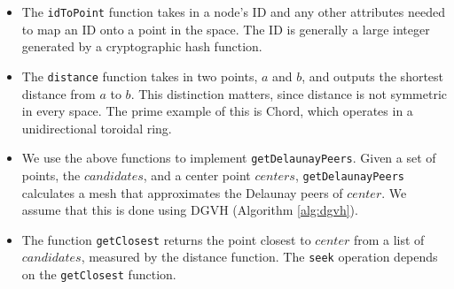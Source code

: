 \documentclass[11pt,conference]{IEEEtran}
\begin{document}
\begin{itemize}

\item The \texttt{idToPoint} function takes in a node's ID and any other attributes needed to map an ID onto a point in the space.
The ID is generally a large integer generated by a cryptographic hash function.


\item The \texttt{distance} function takes in two points, $a$ and $b$, and outputs the shortest distance from $a$ to $b$.
This distinction matters, since distance is not symmetric in every space.
The prime example of this is Chord, which operates in a unidirectional toroidal ring.




\item We use the above functions to implement \texttt{getDelaunayPeers}.
Given a set of points, the $ candidates$, and a center point $ centers$, \texttt{getDelaunayPeers} calculates a mesh that approximates the Delaunay peers of $ center$.
We assume that this is done using DGVH (Algorithm \ref{alg:dgvh}).



\item The function \texttt{getClosest} returns the point closest to $ center$ from a list of $ candidates$, measured by the distance function.
The \texttt{seek} operation depends on the \texttt{getClosest} function.



\end{itemize}
\end{document}

